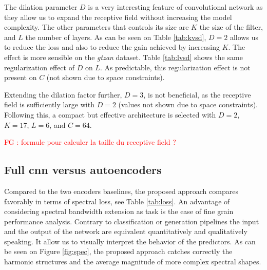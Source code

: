 \documentclass{article}
\newcommand{\fg}[1]{\textcolor{red}{FG : #1}}
\begin{document}
The dilation parameter $D$ is a very interesting feature of convolutional network as they allow us to expand the receptive field without increasing the model complexity. The other parameters that controls its size are $K$ the size of the filter, and $L$ the number of layers. As can be seen on Table \ref{tab:kvsd}, $D=2$ allows us to reduce the loss and also to reduce the gain achieved by increasing $K$. The effect is more sensible on the \textit{gtzan} dataset. Table \ref{tab:lvsd} shows the same regularization effect of $D$ on $L$. As predictable, this regularization effect is not present on $C$ (not shown due to space constraints). %

Extending the dilation factor further, $D=3$, is not beneficial, as the receptive field is sufficiently large with $D=2$ (values not shown due to space constraints). Following this, a compact but effective architecture is selected with $D=2$, $K=17$, $L=6$, and $C=64$.

\fg{formule pour calculer la taille du receptive field ?}




\subsection*{Full cnn versus autoencoders}

Compared to the two encoders baselines, the proposed approach compares favorably in terms of spectral loss, see Table \ref{tab:loss}. An advantage of considering spectral bandwidth extension as task is the ease of fine grain performance analysis. Contrary to classification or generation pipelines the input and the output of the network are equivalent quantitatively and qualitatively speaking. It allow us to visually interpret the behavior of the predictors. As can be seen on Figure \ref{fig:spec}, the proposed approach catches correctly the harmonic structures and the average magnitude of more complex spectral shapes.
\end{document}
